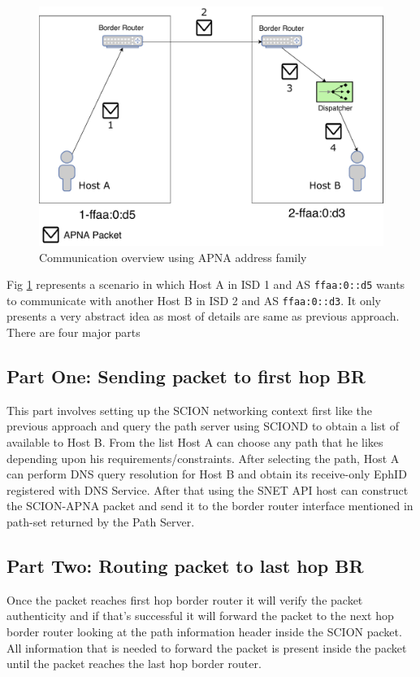 \begin{figure}[th!!]
\centering
\includegraphics[scale=0.5]{Figures/address_family_comm.pdf}
\decoRule
\caption[APNA Service Incoming Packet]{Communication overview using APNA address family}
\label{fig:apna_address_comm}
\end{figure}
Fig \ref{fig:apna_address_comm} represents a scenario in which Host A in ISD 1 and AS \texttt{ffaa:0::d5} wants to communicate with another Host B in ISD 2 and AS \texttt{ffaa:0::d3}. 
It only presents a very abstract idea as most of details are same as previous approach.
There are four major parts

\subsection{Part One: Sending packet to first hop BR }
This part involves setting up the SCION networking context first like the previous approach and query the path server using SCIOND to obtain a list of available to Host B. From the list Host A can choose any path that he likes depending upon his requirements/constraints. After selecting the path, Host A can perform DNS query resolution for Host B and obtain its receive-only EphID registered with DNS Service. After that using the SNET API host can construct the SCION-APNA packet and send it to the border router interface mentioned in path-set returned by the Path Server.

\subsection{Part Two: Routing packet to last hop BR}
Once the packet reaches first hop border router it will verify the packet authenticity and if that's successful it will forward the packet to the next hop border router looking at the path information header inside the SCION packet. All information that is needed to forward the packet is present inside the packet until the packet reaches the last hop border router.

